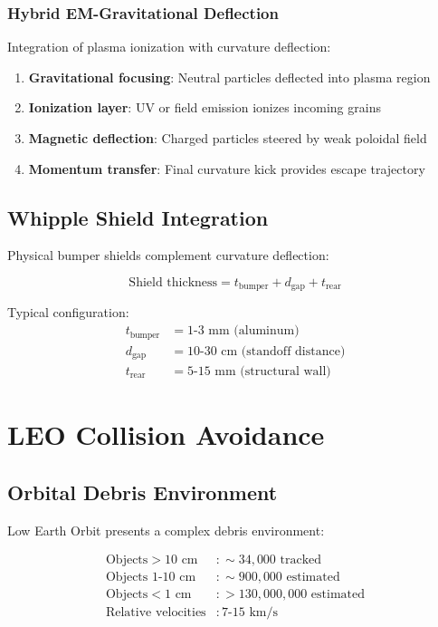 \documentclass[12pt,a4paper]{article}
\begin{document}
\subsubsection{Hybrid EM-Gravitational Deflection}

Integration of plasma ionization with curvature deflection:

\begin{enumerate}
\item \textbf{Gravitational focusing}: Neutral particles deflected into plasma region
\item \textbf{Ionization layer}: UV or field emission ionizes incoming grains
\item \textbf{Magnetic deflection}: Charged particles steered by weak poloidal field
\item \textbf{Momentum transfer}: Final curvature kick provides escape trajectory
\end{enumerate}

\subsection{Whipple Shield Integration}

Physical bumper shields complement curvature deflection:

\begin{equation}
\text{Shield thickness} = t_{\text{bumper}} + d_{\text{gap}} + t_{\text{rear}}
\end{equation}

Typical configuration:
\begin{align}
t_{\text{bumper}} &= 1\text{-}3 \text{ mm (aluminum)} \\
d_{\text{gap}} &= 10\text{-}30 \text{ cm (standoff distance)} \\
t_{\text{rear}} &= 5\text{-}15 \text{ mm (structural wall)}
\end{align}

\section{LEO Collision Avoidance}

\subsection{Orbital Debris Environment}

Low Earth Orbit presents a complex debris environment:

\begin{align}
\text{Objects} > 10 \text{ cm} &: \sim 34,000 \text{ tracked} \\
\text{Objects 1-10 cm} &: \sim 900,000 \text{ estimated} \\
\text{Objects} < 1 \text{ cm} &: > 130,000,000 \text{ estimated} \\
\text{Relative velocities} &: 7\text{-}15 \text{ km/s}
\end{align}
\end{document}
